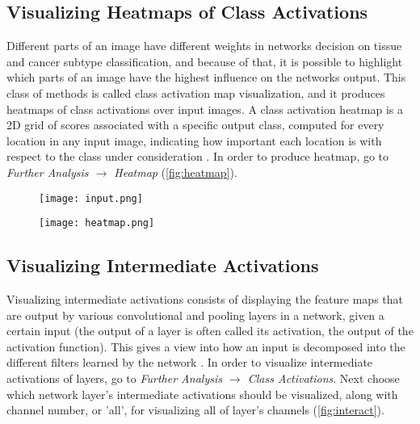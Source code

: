 \subsection{Visualizing Heatmaps of Class Activations}

Different parts of an image have different weights in networks decision on tissue and cancer subtype classification, and because of that, it is possible to highlight which parts of an image have the highest influence on the networks output. This class of methods is called class activation map visualization, and it produces heatmaps of class activations over input images. A class activation heatmap is a 2D grid of scores associated with a specific output class, computed for every location in any input image, indicating how important each location is with respect to the class under consideration \cite{chollet2018deep}. In order to produce heatmap, go to \emph{Further Analysis $\rightarrow$ Heatmap} (\textcolor{red}{\autoref{fig:heatmap}}).

\begin{figure}[h]
	\centering
	\begin{minipage}{.5\textwidth}
		\centering
		\texttt{[image: input.png]}
		\label{fig:input}
	\end{minipage}%
	\begin{minipage}{.5\textwidth}
		\centering
		\texttt{[image: heatmap.png]}
		\label{fig:heatmap}
	\end{minipage}
\end{figure}

\subsection{Visualizing Intermediate Activations}

Visualizing intermediate activations consists of displaying the feature maps that are output by various convolutional and pooling layers in a network, given a certain input (the output of a layer is often called its activation, the output of the activation function). This gives a view into how an input is decomposed into the different filters learned by the network \cite{chollet2018deep}. In order to visualize intermediate activations of layers, go to \emph{Further Analysis $\rightarrow$ Class Activations}. Next choose which network layer's intermediate activations should be visualized, along with channel number, or 'all', for visualizing all of layer's channels  (\textcolor{red}{\autoref{fig:interact}}).

